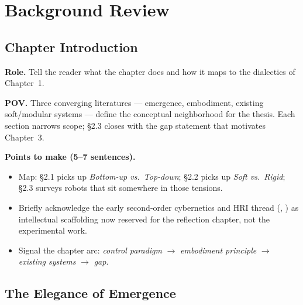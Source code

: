 
\chapter{Background Review}
\label{ch:background}

\section*{Chapter Introduction}
\label{sec:ch2-intro}

\textbf{Role.} Tell the reader what the chapter does and how it
maps to the dialectics of Chapter~1.

\textbf{POV.} Three converging literatures — emergence, embodiment,
existing soft/modular systems — define the conceptual neighborhood
for the thesis. Each section narrows scope; \S2.3 closes with the
gap statement that motivates Chapter~3.

\textbf{Points to make (5--7 sentences).}
\begin{itemize}
    \item Map: \S2.1 picks up \emph{Bottom-up vs.\ Top-down}; \S2.2
          picks up \emph{Soft vs.\ Rigid}; \S2.3 surveys robots that
          sit somewhere in those tensions.
    \item Briefly acknowledge the early second-order cybernetics
          and HRI thread (\cite{glanvilleSECONDORDERCYBERNETICS},
          \cite{sheridanHumanRobotInteractionStatus2016}) as
          intellectual scaffolding now reserved for the reflection
          chapter, not the experimental work.
    \item Signal the chapter arc: \emph{control paradigm} $\rightarrow$
          \emph{embodiment principle} $\rightarrow$ \emph{existing systems}
          $\rightarrow$ \emph{gap}.
\end{itemize}

\section{The Elegance of Emergence}
\label{sec:elegance-emergence}

